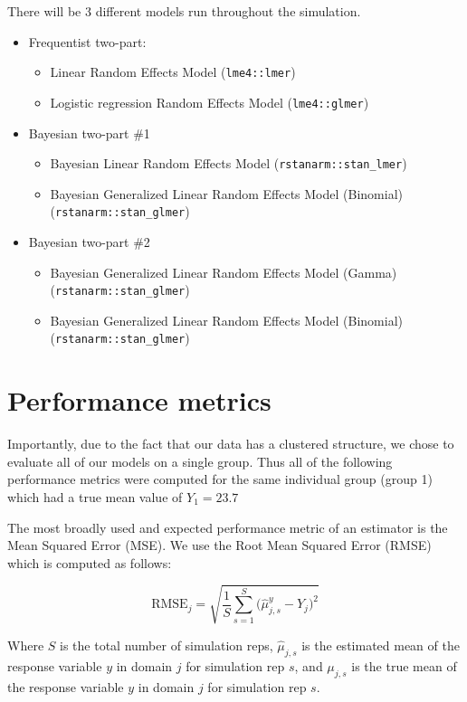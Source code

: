 \documentclass[12pt,twoside]{reedthesis}
\providecommand{\tightlist}{%
  \setlength{\itemsep}{0pt}\setlength{\parskip}{0pt}}
\begin{document}
There will be 3 different models run throughout the simulation.
\begin{itemize}
\tightlist
\item
  Frequentist two-part:
  \begin{itemize}
  \tightlist
  \item
    Linear Random Effects Model (\texttt{lme4::lmer})
  \item
    Logistic regression Random Effects Model (\texttt{lme4::glmer})
  \end{itemize}
\item
  Bayesian two-part \#1
  \begin{itemize}
  \tightlist
  \item
    Bayesian Linear Random Effects Model (\texttt{rstanarm::stan\_lmer})
  \item
    Bayesian Generalized Linear Random Effects Model (Binomial) (\texttt{rstanarm::stan\_glmer})
  \end{itemize}
\item
  Bayesian two-part \#2
  \begin{itemize}
  \tightlist
  \item
    Bayesian Generalized Linear Random Effects Model (Gamma) (\texttt{rstanarm::stan\_glmer})
  \item
    Bayesian Generalized Linear Random Effects Model (Binomial) (\texttt{rstanarm::stan\_glmer})
  \end{itemize}
\end{itemize}
\hypertarget{metrics}{%
\section{Performance metrics}\label{metrics}}

Importantly, due to the fact that our data has a clustered structure, we chose to evaluate all of our models on a single group. Thus all of the following performance metrics were computed for the same individual group (group 1) which had a true mean value of \(Y_1 = 23.7\)

The most broadly used and expected performance metric of an estimator is the Mean Squared Error (MSE). We use the Root Mean Squared Error (RMSE) which is computed as follows:

\[
\text{RMSE}_j  = \sqrt{\frac{1}{S}\sum_{s = 1}^{S}\bigg(\hat{\mu}^y_{j, s} - Y_{j}\bigg)^2}
\]

Where \(S\) is the total number of simulation reps, \(\hat{\mu}_{j, s}\) is the estimated mean of the response variable \(y\) in domain \(j\) for simulation rep \(s\), and \(\mu_{j, s}\) is the true mean of the response variable \(y\) in domain \(j\) for simulation rep \(s\).
\end{document}
